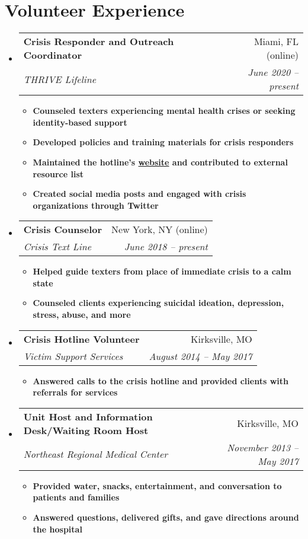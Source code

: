 \documentclass[letterpaper,11pt]{article}
\makeatletter
\newcommand{\resumeItem}[2]{
  \item\small{
    \textbf{#1}{ #2 \vspace{-2pt}}
  }
}
\newcommand{\resumeSubheading}[4]{
  \vspace{-1pt}\item
    \begin{tabular*}{0.97\textwidth}[t]{l@{\extracolsep{\fill}}r}
      \textbf{#1} & #2 \\
      \textit{\small#3} & \textit{\small #4} \\
    \end{tabular*}\vspace{-5pt}
}
\newcommand{\resumeSubHeadingListStart}{\begin{itemize}[leftmargin=*]}
\newcommand{\resumeSubHeadingListEnd}{\end{itemize}}
\newcommand{\resumeItemListStart}{\begin{itemize}}
\newcommand{\resumeItemListEnd}{\end{itemize}\vspace{-5pt}}
\makeatother
\begin{document}
\section{Volunteer Experience}
  \resumeSubHeadingListStart

    \resumeSubheading
      {Crisis Responder and Outreach Coordinator}{Miami, FL (online)}
      {THRIVE Lifeline}{June 2020 -- present}
      \resumeItemListStart
        \resumeItem{\textnormal{Counseled texters experiencing mental health crises or seeking identity-based support}}
          {}
        \resumeItem{\textnormal{Developed policies and training materials for crisis responders}}
          {}
        \resumeItem{\textnormal{Maintained the hotline's \href{https://thrivelifeline.org/}{website} and contributed to external resource list}}
          {}
        \resumeItem{\textnormal{Created social media posts and engaged with crisis organizations through Twitter}}
          {}
      \resumeItemListEnd

    \resumeSubheading
      {Crisis Counselor}{New York, NY (online)}
      {Crisis Text Line}{June 2018 -- present}
      \resumeItemListStart
        \resumeItem{\textnormal{Helped guide texters from place of immediate crisis to a calm state}}
          {}
        \resumeItem{\textnormal{Counseled clients experiencing suicidal ideation, depression, stress, abuse, and more}}
          {}
      \resumeItemListEnd

    \resumeSubheading
      {Crisis Hotline Volunteer}{Kirksville, MO}
      {Victim Support Services}{August 2014 -- May 2017}
      \resumeItemListStart
        \resumeItem{\textnormal{Answered calls to the crisis hotline and provided clients with referrals for services}}
          {}
      \resumeItemListEnd

    \resumeSubheading
      {Unit Host and Information Desk/Waiting Room Host}{Kirksville, MO}
      {Northeast Regional Medical Center}{November 2013 -- May 2017}
      \resumeItemListStart
        \resumeItem{\textnormal{Provided water, snacks, entertainment, and conversation to patients and families}}
          {}
        \resumeItem{\textnormal{Answered questions, delivered gifts, and gave directions around the hospital}}
          {}
      \resumeItemListEnd

  \resumeSubHeadingListEnd

\end{document}
